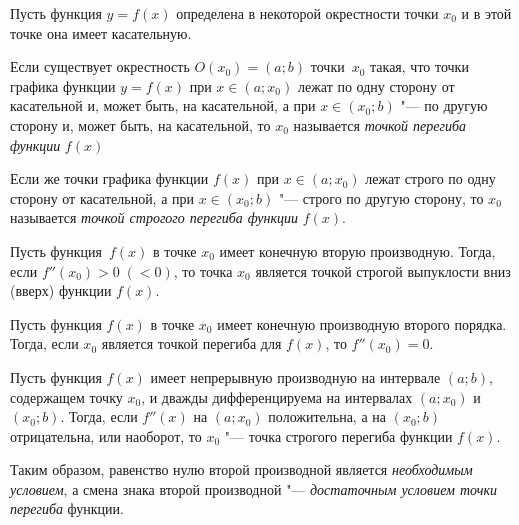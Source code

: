 Пусть функция $y=f(x)$ определена в некоторой окрестности точки $x_0$ и в этой точке она имеет касательную.

\begin{defn}
Если существует окрестность $O(x_0)=(a;b)$ точки~$x_0$ такая, что точки графика функции $y=f(x)$ при $x\in (a;x_0)$ лежат по одну сторону от касательной и, может быть, на касательной, а при $x\in(x_0;b)$ "--- по другую сторону и, может быть, на касательной, то $x_0$ называется \textit{точкой перегиба функции} $f(x)$

Если же точки графика функции $f(x)$ при $x\in(a;x_0)$ лежат строго по одну сторону от касательной, а при $x\in (x_0;b)$ "--- строго по другую сторону, то $x_0$ называется \textit{точкой строгого перегиба функции} $f(x)$.
\end{defn}

\begin{thm}
Пусть функция~$f(x)$ в точке $x_0$ имеет конечную вторую производную. Тогда, если $f''(x_0)>0\; (<0)$, то точка $x_0$ является точкой строгой выпуклости вниз (вверх) функции $f(x)$. 
\end{thm}

\begin{cons}
Пусть функция $f(x)$ в точке $x_0$ имеет конечную производную второго порядка. Тогда, если $x_0$ является точкой перегиба для $f(x)$, то $f''(x_0)=0$.
\end{cons}

\begin{thm}
Пусть функция $f(x)$ имеет непрерывную производную на интервале $(a;b)$, содержащем точку $x_0$, и дважды дифференцируема на интервалах $(a;x_0)$ и $(x_0;b)$. Тогда, если $f''(x)$ на $(a;x_0)$ положительна, а на $(x_0;b)$ отрицательна, или наоборот, то $x_0$ "--- точка строгого перегиба функции $f(x)$. 
\end{thm}

Таким образом, равенство нулю второй производной является \textit{необходимым условием}, а смена знака второй производной "--- \textit{достаточным условием точки перегиба} функции.
